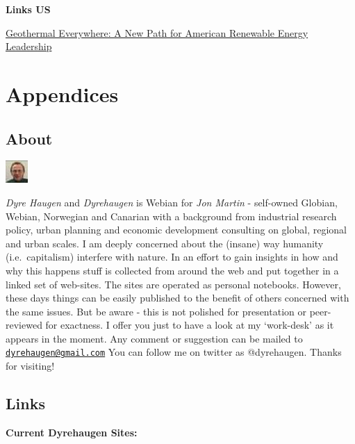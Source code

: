 \documentclass[
]{book}
\begin{document}
\textbf{Links US}

\href{https://innovationfrontier.org/geothermal-everywhere-a-new-path-for-american-renewable-energy-leadership/}{Geothermal Everywhere: A New Path for American Renewable Energy Leadership}

\hypertarget{part-appendices}{%
\part{Appendices}\label{part-appendices}}

\hypertarget{appendix-appendices}{%
\appendix}


\hypertarget{about}{%
\chapter{About}\label{about}}

\includegraphics{fig/me.jpg}

\emph{Dyre Haugen} and \emph{Dyrehaugen} is Webian for \emph{Jon Martin} -
self-owned Globian, Webian, Norwegian and Canarian with
a background from industrial research policy, urban planning and
economic development consulting on global, regional and urban scales.
I am deeply concerned about the (insane) way
humanity (i.e.~capitalism) interfere with nature.
In an effort to gain insights in how and why this happens
stuff is collected from around the web and put together
in a linked set of web-sites.
The sites are operated as personal notebooks.
However, these days things can be easily published to the
benefit of others concerned with the same issues.
But be aware - this is not polished for presentation or
peer-reviewed for exactness.
I offer you just to have a look at my `work-desk' as it appears in the moment.
Any comment or suggestion can be mailed to \href{mailto:dyrehaugen@gmail.com}{\nolinkurl{dyrehaugen@gmail.com}}
You can follow me on twitter as @dyrehaugen.
Thanks for visiting!

\hypertarget{links}{%
\chapter{Links}\label{links}}

\textbf{Current Dyrehaugen Sites:}
\end{document}

